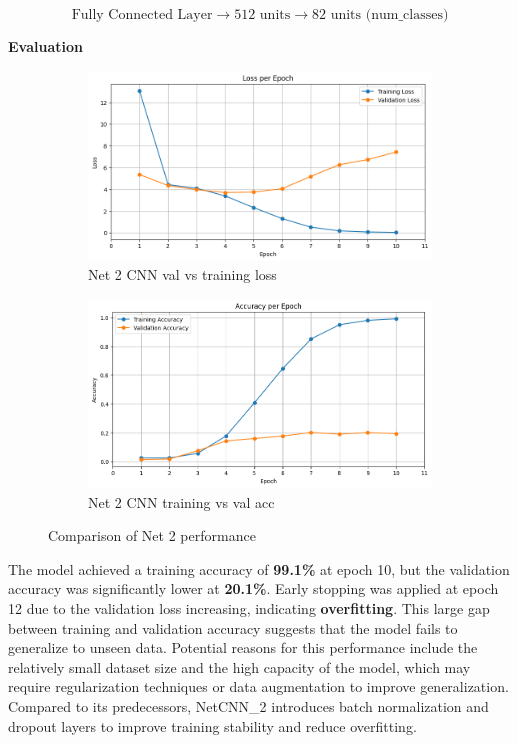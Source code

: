 \documentclass[12pt]{article}
\begin{document}
\[
\text{Fully Connected Layer} \rightarrow \text{512 units} \rightarrow \text{82 units (num\_classes)}
\]

\textbf{Evaluation}

\begin{figure}[ht]
    \centering
    \begin{subfigure}{0.45\linewidth}
        \centering
        \includegraphics[width=\linewidth]{net2_loss.png}
        \caption{Net 2 CNN val vs training loss}
        \label{fig:net2_loss}
    \end{subfigure}
    \hfill
    \begin{subfigure}{0.45\linewidth}
        \centering
        \includegraphics[width=\linewidth]{net2_acc.png}
        \caption{Net 2 CNN training vs val acc}
        \label{fig:net2_acc}
    \end{subfigure}
    \caption{Comparison of Net 2 performance}
    \label{fig:net2_performance}
\end{figure}

The model achieved a training accuracy of \textbf{99.1\%} at epoch 10, but the validation accuracy was significantly lower at \textbf{20.1\%}. Early stopping was applied at epoch 12 due to the validation loss increasing, indicating \textbf{overfitting}. This large gap between training and validation accuracy suggests that the model fails to generalize to unseen data. Potential reasons for this performance include the relatively small dataset size and the high capacity of the model, which may require regularization techniques or data augmentation to improve generalization. Compared to its predecessors, NetCNN\_2 introduces batch normalization and dropout layers to improve training stability and reduce overfitting.
\end{document}
